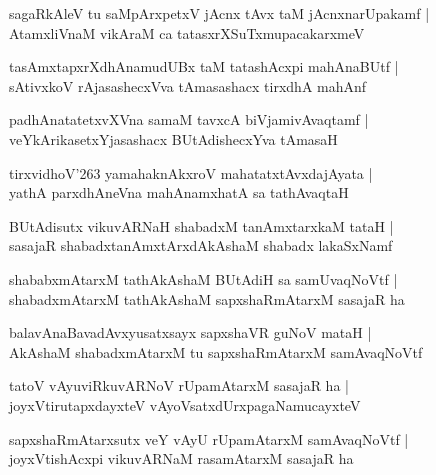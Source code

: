\documentclass[twoside,12pt,openright]{book}
\newcounter{shloka}[chapter]
\begin{document}
\begin{shloka}
sagaRkAleV tu saMpArxpetxV jAcnx tAvx taM jAcnxnarUpakamf |\\
AtamxliVnaM vikAraM ca tatasxrXSuTxmupacakarxmeV
\end{shloka}

\begin{shloka}
tasAmxtapxrXdhAnamudUBx taM tatashAcxpi mahAnaBUtf |\\
sAtivxkoV rAjasashecxVva tAmasashacx tirxdhA mahAnf
\end{shloka}

\begin{shloka}
padhAnatatetxvXVna samaM tavxcA biVjamivAvaqtamf |\\
veYkArikasetxYjasashacx BUtAdishecxYva tAmasaH
\end{shloka}

\begin{shloka}
tirxvidhoV\char'263 yamahaknAkxroV mahatatxtAvxdajAyata |\\
yathA parxdhAneVna mahAnamxhatA sa tathAvaqtaH
\end{shloka}

\begin{shloka}
BUtAdisutx vikuvARNaH shabadxM tanAmxtarxkaM tataH |\\
sasajaR shabadxtanAmxtArxdAkAshaM shabadx lakaSxNamf
\end{shloka}

\begin{shloka}
shababxmAtarxM tathAkAshaM BUtAdiH sa samUvaqNoVtf |\\
shabadxmAtarxM tathAkAshaM sapxshaRmAtarxM sasajaR ha
\end{shloka}

\begin{shloka}
balavAnaBavadAvxyusatxsayx sapxshaVR guNoV mataH |\\
AkAshaM shabadxmAtarxM tu sapxshaRmAtarxM samAvaqNoVtf
\end{shloka}

\begin{shloka}
tatoV vAyuviRkuvARNoV rUpamAtarxM sasajaR ha |\\
joyxVtirutapxdayxteV vAyoVsatxdUrxpagaNamucayxteV
\end{shloka}

\begin{shloka}
sapxshaRmAtarxsutx veY vAyU rUpamAtarxM samAvaqNoVtf |\\
joyxVtishAcxpi vikuvARNaM rasamAtarxM sasajaR ha
\end{shloka}
\end{document}
